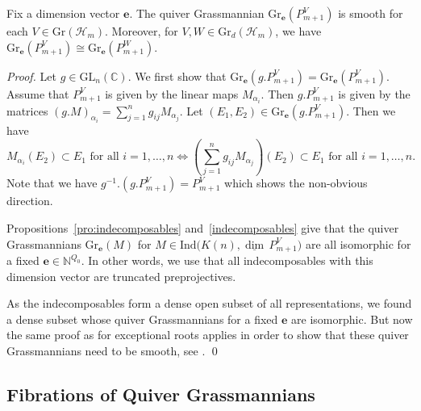 \documentclass[smallextended,envcountsect,envcountsame]{svjour3}
\numberwithin{equation}{section}
\newcommand{\CC}{\mathbb{C}}
\newcommand{\NN}{\mathbb{N}}
\newcommand{\bfe}{\mathbf{e}}
\newcommand{\cH}{\mathcal{H}}
\newcommand\udim{{\underline{\dim}\, }}
\newcommand{\Gr}{\mathrm{Gr}}
\newcommand{\GL}{\mathrm{GL}}
\newcommand{\Ind}{\mathrm{Ind}}
\begin{document}
\begin{theorem}
  \label{thm:truncpp}
  Fix a dimension vector $\bfe$.
  The quiver Grassmannian $\Gr_\bfe(P_{m+1}^V)$ is smooth for each $V\in \Gr(\cH_m)$.
  Moreover, for $V,W\in \Gr_d(\cH_m)$, we have $\Gr_\bfe(P_{m+1}^V)\cong \Gr_\bfe(P_{m+1}^W)$.
\end{theorem}
\begin{proof}
  Let $g\in\GL_n(\CC)$.
  We first show that $\Gr_\bfe(g.P_{m+1}^V)=\Gr_\bfe(P_{m+1}^V)$.
  Assume that $P_{m+1}^V$ is given by the linear maps $M_{\alpha_i}$.
  Then $g.P_{m+1}^V$ is given by the matrices $(g.M)_{\alpha_i}=\sum\limits_{j=1}^n g_{ij}M_{\alpha_j}$.
  Let $(E_1,E_2)\in\Gr_\bfe(g.P_{m+1}^V)$.
  Then we have  
  \[M_{\alpha_i}(E_2)\subset E_1 \text{ for all } i=1,\ldots,n\Leftrightarrow \left(\sum\limits_{j=1}^n g_{ij}M_{\alpha_j}\right)(E_2)\subset E_1 \text{ for all } i=1,\ldots,n.\]
  Note that we have $g^{-1}.(g.P_{m+1}^V)=P_{m+1}^V$ which shows the non-obvious direction.

  Propositions~\ref{pro:indecomposables} and~\ref{indecomposables} give that the quiver Grassmannians $\Gr_\bfe(M)$ for $M\in\Ind\big(K(n),\udim P_{m+1}^V\big)$ are all isomorphic for a fixed $\bfe\in\NN^{Q_0}$.
  In other words, we use that all indecomposables with this dimension vector are truncated preprojectives.

  As the indecomposables form a dense open subset of all representations, we found a dense subset whose quiver Grassmannians for a fixed $\bfe$ are isomorphic.
  But now the same proof as for exceptional roots applies in order to show that these quiver Grassmannians need to be smooth, see \cite[Corollary 4]{cr}.
\qed\end{proof}


\subsection{Fibrations of Quiver Grassmannians}
\label{sec:fibrations}
\end{document}
